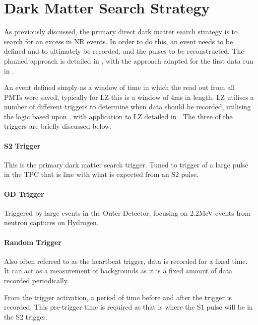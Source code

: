 \section{Dark Matter Search Strategy}
\par
As previously discussed, the primary direct dark matter search strategy is to search for an excess in NR events.
In order to do this, an event needs to be defined and to ultimately be recorded, and the pulses to be reconstructed.
The planned approach is detailed in \cite{LZ_TechnicalDesignReview_ref}, with the approach adapted for the first data run in \cite{lz_ws_sr1_ref}.

\par
An event defined simply as a window of time in which the read out from all PMTs were saved, typically for LZ this is a window of 4ms in length.
LZ utilises a number of different triggers to determine when data should be recorded, utilising the logic based upon \cite{lux_trigger_logic_ref}, with application to LZ detailed in \cite{nicolasangelides_thesis_ref}.
The three of the triggers are briefly discussed below.

\paragraph{S2 Trigger}
\par
This is the primary dark matter search trigger.
Tuned to trigger of a large pulse in the TPC that is line with what is expected from an S2 pulse.

\paragraph{OD Trigger}
\par
Triggered by large events in the Outer Detector, focusing on 2.2MeV events from neutron captures on Hydrogen.

\paragraph{Random Trigger}
Also often referred to as the heartbeat trigger, data is recorded for a fixed time.
It can act as a measurement of backgrounds as it is a fixed amount of data recorded periodically.

\par
From the trigger activation, a period of time before and after the trigger is recorded.
This pre-trigger time is required as that is where the S1 pulse will be in the S2 trigger.

